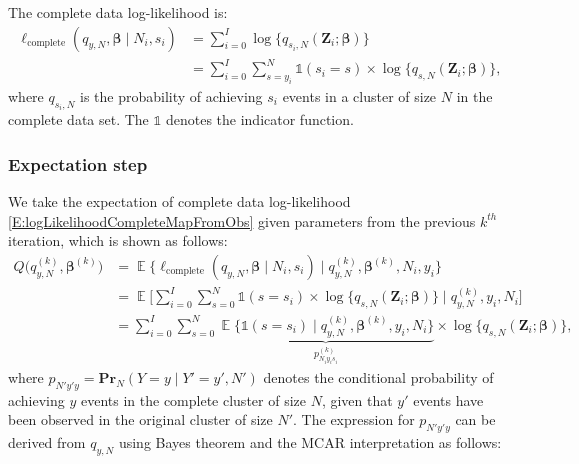 \documentclass[reqno]{amsart}
\DeclareMathOperator{\E}{\mathbb{E}}
\begin{document}
The complete data log-likelihood is:
\begin{equation}\label{E:logLikelihoodCompleteMapFromObs}
\begin{split}
    \ell_{\text{complete}} (q_{y,N}, \boldsymbol{\beta} \mid N_i,s_i) &= \sum_{i=0}^I \log \{ q_{s_i,N}(\boldsymbol{Z}_i; \boldsymbol{\beta}) \} \\
    &= \sum_{i=0}^I \sum_{s=y_i}^N {\mathds{1}}(s_i=s) \times \log \{ q_{s,N}(\boldsymbol{Z}_i; \boldsymbol{\beta}) \}, 
\end{split}
\end{equation}
where $q_{s_i,N}$ is the probability of achieving $s_i$ events in a cluster of size $N$ in the complete data set. The $\mathds{1}$ denotes the indicator function.



\subsubsection{Expectation step}
We take the expectation of complete data log-likelihood \eqref{E:logLikelihoodCompleteMapFromObs} given parameters from the previous $k^{th}$ iteration, which is shown as follows:
\begin{equation}\label{E:ExpectedlogLikelihoodCompleteMapFromObs}
\begin{split}
    Q \bigg( q_{y,N}^{(k)}, \boldsymbol{\beta}^{(k)} \bigg) &= 
     \E \bigg\{ \ell_{\text{complete}} (q_{y,N}, \boldsymbol{\beta} \mid N_i, s_i) \mid q_{y,N}^{(k)}, \boldsymbol{\beta}^{(k)}, N_i, y_i \bigg\} \\
    &= \E \Bigg[ \sum_{i=0}^I \sum_{s=0}^N {\mathds{1}}(s=s_i) \times \log \{ q_{s,N}(\boldsymbol{Z}_i; \boldsymbol{\beta}) \} \mid q_{y,N}^{(k)}, y_i,N_i \Bigg] \\
    &= \sum_{i=0}^I \sum_{s=0}^N \underbrace{ \E \big\{ {\mathds{1}}(s=s_i) \mid q_{y,N}^{(k)}, \boldsymbol{\beta}^{(k)}, y_i, N_i \big\}}_{p_{N_iy_is_i}^{(k)}} \times \log \{q_{s,N}(\boldsymbol{Z}_i; \boldsymbol{\beta}) \},
\end{split}
\end{equation}
where $p_{N'y'y} = \textbf{Pr}_N(Y=y \mid Y'=y',N')$ denotes the conditional probability of achieving $y$ events in the complete cluster of size $N$, given that $y'$ events have been observed in the original cluster of size $N'$. 
The expression for $p_{N'y'y}$ can be derived from $q_{y,N}$ using Bayes theorem and the MCAR interpretation as follows:
\end{document}
